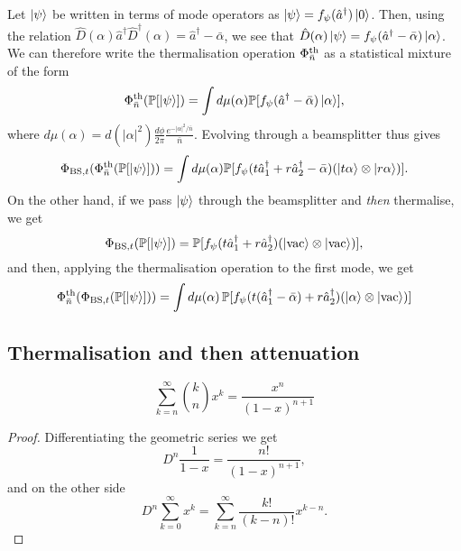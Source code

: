 \documentclass[12pt]{report}
\newcommand{\PP}{\mathbb{P}}
\begin{document}
Let $\ket\psi$ be written in terms of mode operators as
$\ket\psi=f_\psi(\hat a^\dagger)\ket0$.
Then, using the relation $\hat D(\alpha) \hat a^\dagger \hat D^\dagger(\alpha)=\hat a^\dagger -\bar\alpha$, we see that
$\hat D(\alpha)\ket\psi=f_\psi(\hat a^\dagger-\bar\alpha)\ket\alpha$.
We can therefore write the thermalisation operation $\Phi^{\rm th}_{\bar n}$ as a statistical mixture of the form
\begin{equation}
	\Phi^{\rm th}_{\bar n}(\PP[\ket\psi])
	= \int d\mu(\alpha)
	\PP[f_\psi(\hat a^\dagger-\bar\alpha)\ket\alpha],
\end{equation}
where $d\mu(\alpha)=d(|\alpha|^2)\frac{d\phi}{2\pi} \frac{e^{-|\alpha|^2/\bar n}}{\bar n}$.
Evolving through a beamsplitter thus gives
\begin{equation}
	\Phi_{{\rm BS},t}(\Phi_{\bar n}^{\rm th}(\PP[\ket\psi]))
	= \int d\mu(\alpha)
	\PP[f_\psi(t \hat a_1^\dagger + r \hat a_2^\dagger-\bar\alpha)
	(\ket{t\alpha}\otimes\ket{r\alpha})
	].
\end{equation}
On the other hand, if we pass $\ket\psi$ through the beamsplitter and \emph{then} thermalise, we get
\begin{equation}
	\Phi_{{\rm BS},t}(\PP[\ket\psi])
	= \PP[f_{\psi}(t \hat a_1^\dagger + r\hat a_2^\dagger)
	(\ket{\rm vac}\otimes \ket{\rm vac})
	],
\end{equation}
and then, applying the thermalisation operation to the first mode, we get
\begin{equation}
	\Phi_{\bar n}^{\rm th}(\Phi_{{\rm BS},t}(\PP[\ket\psi]))
	= \int d\mu(\alpha)\,
	\PP[
	f_\psi(t (\hat a_1^\dagger-\bar\alpha) + r\hat a_2^\dagger)
	(\ket\alpha\otimes\ket{\rm vac})
	]
\end{equation}


\subsection{Thermalisation and then attenuation}

\begin{prop}\label{eq:generalised_geometric_series}
	\begin{equation}
		\sum_{k=n}^\infty \binom{k}{n} x^k
		= \frac{x^n}{(1-x)^{n+1}}
	\end{equation}
\end{prop}
\begin{proof}
	Differentiating the geometric series we get
	\begin{equation}
		D^n \frac{1}{1-x} = \frac{n!}{(1-x)^{n+1}},
	\end{equation}
	and on the other side
	\begin{equation}
		D^n \sum_{k=0}^\infty x^k
		= \sum_{k=n}^\infty \frac{k!}{(k-n)!} x^{k-n}.
	\end{equation}
\end{proof}
\end{document}
